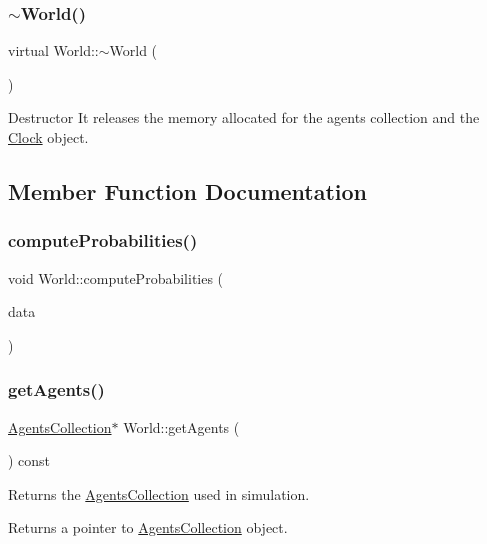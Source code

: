 \subsubsection{\texorpdfstring{$\sim$\+World()}{~World()}}
{\footnotesize\ttfamily virtual World\+::$\sim$\+World (\begin{DoxyParamCaption}{ }\end{DoxyParamCaption})\hspace{0.3cm}{\ttfamily [virtual]}}

Destructor It releases the memory allocated for the agents collection and the \hyperlink{class_clock}{Clock} object. 

\subsection{Member Function Documentation}
\mbox{\label{class_world_ad98b713484ef1c92ded7eec352a496a5}} 
\subsubsection{\texorpdfstring{compute\+Probabilities()}{computeProbabilities()}}
{\footnotesize\ttfamily void World\+::compute\+Probabilities (\begin{DoxyParamCaption}\item[{std\+::map$<$ unsigned long, vector$<$ \hyperlink{class_antenna_info}{Antenna\+Info} $>$$>$}]{data }\end{DoxyParamCaption})}

\mbox{\label{class_world_a8cf8a54ae1f3cb61efeba2b3acebb7cc}} 
\subsubsection{\texorpdfstring{get\+Agents()}{getAgents()}}
{\footnotesize\ttfamily \hyperlink{class_agents_collection}{Agents\+Collection}$\ast$ World\+::get\+Agents (\begin{DoxyParamCaption}{ }\end{DoxyParamCaption}) const}

Returns the \hyperlink{class_agents_collection}{Agents\+Collection} used in simulation. \begin{DoxyReturn}{Returns}
a pointer to \hyperlink{class_agents_collection}{Agents\+Collection} object. 
\end{DoxyReturn}
\mbox{\label{class_world_aa51e0799a58035305307e398a81ffeb2}} 
